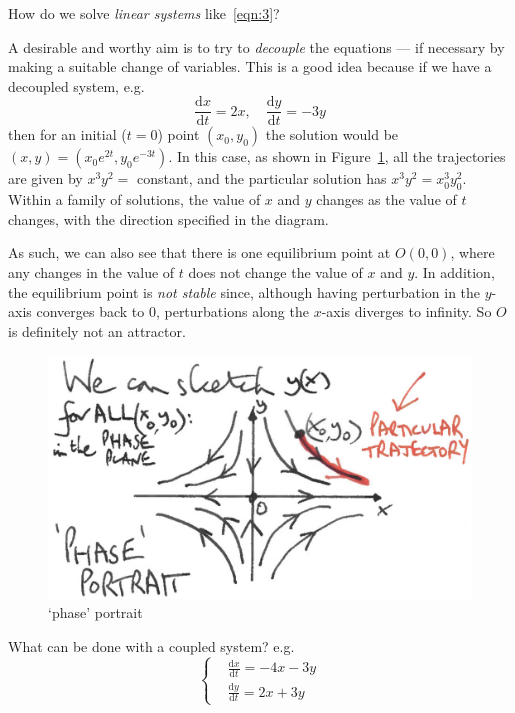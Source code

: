 \documentclass[12pt]{report}
\theoremstyle{definition}
\begin{document}
How do we solve \emph{linear systems} like~\eqref{eqn:3}?

A desirable and worthy aim is to try to \emph{decouple} the equations ---
if necessary by making a suitable change of variables. This is a good idea
because if we have a decoupled system, e.g.\[
    \frac{\mathrm{d}x}{\mathrm{d}t} = 2x, \quad \frac{\mathrm{d}y}{\mathrm{d}t} = -3y
\]then for an initial ($t = 0$) point $(x_0, y_0)$ the solution would be
$(x,y) = (x_0 e^{2t}, y_0 e^{-3t})$. In this case, as shown in Figure~\ref{fig:phasePortrait},
all the trajectories are given by
$x^{3}y^{2} =$ constant, and the particular solution has $x^{3}y^{2} = x_0^{3}y_0^{2}$.
Within a family of solutions, the value of $x$ and $y$ changes as the value of $t$ changes,
with the direction specified in the diagram. 

As such, we can also see that there is one equilibrium point at $O(0, 0)$, where any changes
in the value of $t$ does not change the value of $x$ and $y$. In addition, the equilibrium point
is \emph{not stable} since, although having perturbation in the $y$-axis converges back to 0,
perturbations along the $x$-axis diverges to infinity. So $O$ is definitely not an attractor.

\begin{figure}
  	\includegraphics[scale=0.15]{phasePortrait.jpeg}
  	\centering
    \caption{`phase' portrait}\label{fig:phasePortrait}
\end{figure}

\bigskip
What can be done with a coupled system? e.g.
\begin{equation}\label{eqn:5}
    \left\{
        \begin{align*}
            & \frac{\mathrm{d}x}{\mathrm{d}t} = -4x - 3y \\
            & \frac{\mathrm{d}y}{\mathrm{d}t} = 2x + 3y
        \end{align*}\right.
\end{equation}
\end{document}
